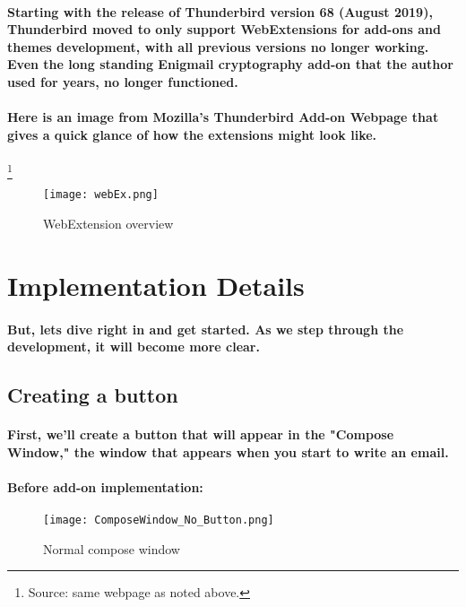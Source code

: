 \paragraph{Starting with the release of Thunderbird version 68 (August 2019), Thunderbird moved to only support WebExtensions for add-ons and themes development, with all previous versions no longer working. Even the long standing Enigmail cryptography add-on that the author used for years, no longer functioned.}

\paragraph{Here is an image from Mozilla's Thunderbird Add-on Webpage that gives a quick glance of how the extensions might look like.}\footnote{Source: same webpage as noted above.}


\begin{figure}[H]
\centering
\texttt{[image: webEx.png]}
\caption{\label{fig: webEx} WebExtension overview}
\end{figure}


\section{Implementation Details}
\paragraph{But, lets dive right in and get started. As we step through the development, it will become more clear.}

\subsection{Creating a button}

\paragraph{First, we'll create a button that will appear in the "Compose Window," the window that appears when you start to write an email.}

\paragraph{Before add-on implementation:}

\begin{figure}[H]
    \centering
    \texttt{[image: ComposeWindow\_No\_Button.png]}
    \caption{\label{fig: noButton} Normal compose window}
\end{figure}

